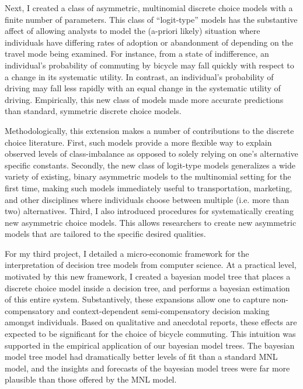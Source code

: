 Next, I created a class of asymmetric, multinomial discrete choice models with a finite number of parameters. This class of ``logit-type'' models has the substantive affect of allowing analysts to model the (a-priori likely) situation where individuals have differing rates of adoption or abandonment of depending on the travel mode being examined. For instance, from a state of indifference, an individual's probability of commuting by bicycle may fall quickly with respect to a change in its systematic utility. In contrast, an individual's probability of driving may fall less rapidly with an equal change in the systematic utility of driving. Empirically, this new class of models made more accurate predictions than standard, symmetric discrete choice models.

Methodologically, this extension makes a number of contributions to the discrete choice literature. First, such models provide a more flexible way to explain observed levels of class-imbalance as opposed to solely relying on one's alternative specific constants. Secondly, the new class of logit-type models generalizes a wide variety of existing, binary asymmetric models to the multinomial setting for the first time, making such models immediately useful to transportation, marketing, and other disciplines where individuals choose between multiple (i.e. more than two) alternatives. Third, I also introduced procedures for systematically creating new asymmetric choice models. This allows researchers to create new asymmetric models that are tailored to the specific desired qualities.

For my third project, I detailed a micro-economic framework for the interpretation of decision tree models from computer science. At a practical level, motivated by this new framework, I created a bayesian model tree that places a discrete choice model inside a decision tree, and performs a bayesian estimation of this entire system. Substantively, these expansions allow one to capture non-compensatory and context-dependent semi-compensatory decision making amongst individuals. Based on qualitative and anecdotal reports, these effects are expected to be significant for the choice of bicycle commuting. This intuition was supported in the empirical application of our bayesian model trees. The bayesian model tree model had dramatically better levels of fit than a standard MNL model, and the insights and forecasts of the bayesian model trees were far more plausible than those offered by the MNL model.

